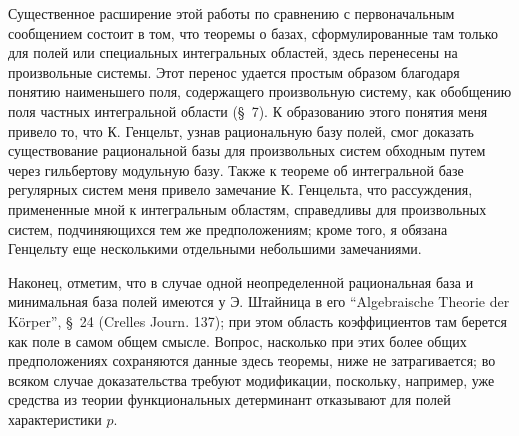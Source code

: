 \documentclass[11pt]{article}
\begin{document}
Существенное расширение этой работы по сравнению с первоначальным сообщением состоит в том, что теоремы о базах, сформулированные там только для полей или специальных интегральных областей, здесь перенесены на произвольные системы. Этот перенос удается простым образом благодаря понятию наименьшего поля, содержащего произвольную систему, как обобщению поля частных интегральной области (\S\ 7). К образованию этого понятия меня привело то, что К. Генцельт, узнав рациональную базу полей, смог доказать существование рациональной базы для произвольных систем обходным путем через гильбертову модульную базу. Также к теореме об интегральной базе регулярных систем меня привело замечание К. Генцельта, что рассуждения, примененные мной к интегральным областям, справедливы для произвольных систем, подчиняющихся тем же предположениям; кроме того, я обязана Генцельту еще несколькими отдельными небольшими замечаниями.

Наконец, отметим, что в случае одной неопределенной рациональная база и минимальная база полей имеются у Э. Штайница в его ``Algebraische Theorie der Körper'', \S\ 24 (Crelles Journ. 137); при этом область коэффициентов там берется как поле в самом общем смысле. Вопрос, насколько при этих более общих предположениях сохраняются данные здесь теоремы, ниже не затрагивается; во всяком случае доказательства требуют модификации, поскольку, например, уже средства из теории функциональных детерминант отказывают для полей характеристики $p$.
\end{document}
